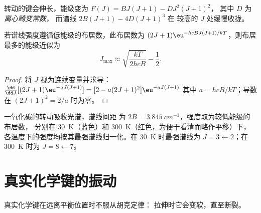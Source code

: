 \begin{definition}[离心畸变常数]\label{def:b3:rovibrational-spectroscopy:centrifugal}
转动的键会伸长，能级变为 $F(J) = BJ(J+1) - DJ^2(J+1)^2$，
其中 $D$ 为\emph{离心畸变常数}，
而谱线 $2B(J+1) - 4D(J+1)^3$ 在
较高的 $J$ 处缓慢收拢。
\end{definition}

\begin{proposition}[最强谱线]\label{prop:b3:rovibrational-spectroscopy:jmax}
若谱线强度遵循低能级的布居数，此布居数为 $(2J+1)
\eu^{-hcBJ(J+1)/kT}$，则布居最多的能级近似为
\[
J_{\max} \approx \sqrt{\frac{kT}{2hcB}} - \frac12.
\]
\end{proposition}

\begin{proof}
将 $J$ 视为连续变量并求导：$\frac{\dd}{\dd J}[(2J+1)\eu^{-aJ(J+1)}]
= [2 - a(2J+1)^2]\eu^{-aJ(J+1)}$ 其中 $a = hcB/kT$；导数在 $(2J + 1)^2 =
2/a$ 时为零。
\end{proof}

\begin{omfigure}

{\small 一氧化碳的转动吸收光谱，谱线间距
为 $2B = \qty{3.845}{cm^{-1}}$，强度取为较低能级的布居数，
分别在 \qty{30}{K}（蓝色）和 \qty{300}{K}（红色，为便于看清而略作平移）下，
各温度下的强度均按其最强谱线归一化。在 \qty{30}{K} 时最强谱线为
$J = 3 \leftarrow 2$；在 \qty{300}{K} 时为 $J = 8 \leftarrow 7$。}
\end{omfigure}

\section{真实化学键的振动}\label{sec:b3:rovibrational-spectroscopy:real-bonds}

真实化学键在远离平衡位置时不服从胡克定律：
拉伸时它会变软，直至断裂。

